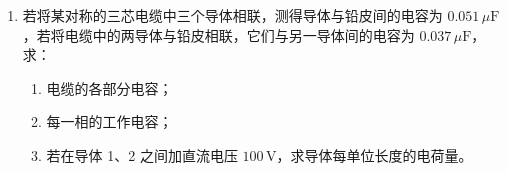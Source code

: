 \begin{enumerate}[label=\arabic*.]
\vspace{0.5em}
(1) 已知 \(\varphi_1, \varphi_2\)，求 \(q_1, q_2\)。

联立上述方程组，解得：
\[
q_1 = \frac{4\pi\varepsilon_0}{1 - (a/d)^2} \left( a\varphi_1 - \frac{a^2}{d}\varphi_2 \right)
\]
\[
q_2 = \frac{4\pi\varepsilon_0}{1 - (a/d)^2} \left( a\varphi_2 - \frac{a^2}{d}\varphi_1 \right)
\]

\vspace{0.5em}
(2) 已知 \(\varphi_1, q_2\)，求 \(q_1, \varphi_2\)。

由第一个方程解得 \(q_1\)：
\[
q_1 = 4\pi\varepsilon_0 a\varphi_1 - \frac{a}{d}q_2
\]
将 \(q_1\) 代入第二个方程，得 \(\varphi_2\)：
\[
\varphi_2 = \frac{1}{4\pi\varepsilon_0} \left( \frac{4\pi\varepsilon_0 a\varphi_1 - \frac{a}{d}q_2}{d} + \frac{q_2}{a} \right) = \frac{a}{d}\varphi_1 + \frac{q_2}{4\pi\varepsilon_0} \left( \frac{1}{a} - \frac{a}{d^2} \right)
\]

\vspace{0.5em}
(3) 使小球1带电荷 \(q_1=10^{-8}\,\text{C}\)、小球2不带电荷（\(q_2=0\)）的办法。

题目要求：\(\boldsymbol{q_1 = 10^{-8}\,\text{C}}\)（小球1带电），\(\boldsymbol{q_2 = 0}\)（小球2完全不带电）。

直接将小球2接地会使其感应出电荷，无法满足 \(q_2=0\)。正确方法如下：
\begin{itemize}
    \item \textbf{对小球1}：将小球1置于空气中，直接通过充电方式使其带电量为 \(q_1 = 10^{-8}\,\text{C}\)，保持与小球2距离 \(d=20\,\text{cm}\) 不变。
    \item \textbf{对小球2}：将小球2放入一个**接地的闭合金属导体空腔**内部，实现静电屏蔽。
    \item 屏蔽效果：空腔外部电荷 \(q_1\) 的电场无法进入内部，小球2不受任何外电场影响，因此不会产生感应电荷，可保持净电荷 \(q_2=0\)。
\end{itemize}

综上，最终方案：
\textbf{小球1直接充电至 \(q_1=10^{-8}\,\text{C}\)，小球2放入接地金属空腔内实现静电屏蔽，保证 \(q_2=0\)。}

\vspace{1em}

\item 若将某对称的三芯电缆中三个导体相联，测得导体与铅皮间的电容为 \(0.051\,\mu\text{F}\)，若将电缆中的两导体与铅皮相联，它们与另一导体间的电容为 \(0.037\,\mu\text{F}\)，求：
\begin{enumerate}
    \item 电缆的各部分电容；
    \item 每一相的工作电容；
    \item 若在导体 1、2 之间加直流电压 \(100\,\text{V}\)，求导体每单位长度的电荷量。
\end{enumerate}


\end{enumerate}
